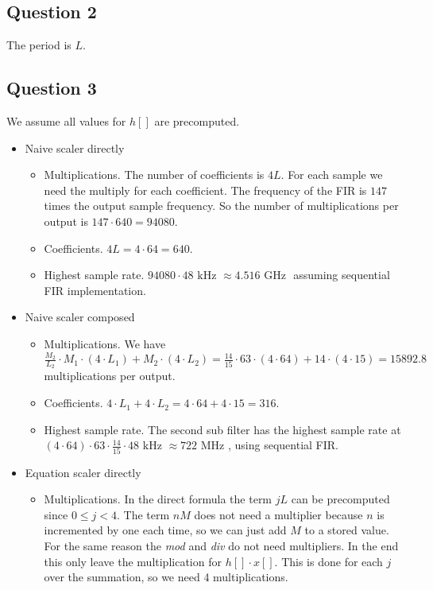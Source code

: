 \subsection{Question 2}
The period is $L$.

\subsection{Question 3} \label{sec:Q3}
We assume all values for $h[]$ are precomputed.
\begin{itemize}
\item Naive scaler directly
\begin{itemize}
\item Multiplications. The number of coefficients is $4L$. For each sample we need the multiply for each coefficient. The frequency of the FIR is $147$ times the output sample frequency. So the number of multiplications per output is $147 \cdot 640 = 94080$.
\item Coefficients. $4L = 4 \cdot 64 = 640$.
\item Highest sample rate. $94080 \cdot 48 \text{ kHz } \approx 4.516  \text{ GHz }$ assuming sequential FIR implementation.
\end{itemize}
\item Naive scaler composed
\begin{itemize}
\item Multiplications. We have $\frac{M_2}{L_2} \cdot M_1 \cdot (4 \cdot L_1) + M_2 \cdot (4 \cdot L_2) = \frac{14}{15} \cdot 63 \cdot (4 \cdot 64) + 14 \cdot (4 \cdot 15) = 15892.8$ multiplications per output. 
\item Coefficients. $4 \cdot L_1 + 4 \cdot L_2 = 4 \cdot 64 + 4\cdot 15 = 316$.
\item Highest sample rate. The second sub filter has the highest sample rate at $(4 \cdot 64) \cdot 63 \cdot \frac{14}{15} \cdot 48 \text{ kHz } \approx 722\text{ MHz }$, using sequential FIR.
\end{itemize}
\item Equation scaler directly
\begin{itemize}
\item Multiplications. In the direct formula the term $jL$ can be precomputed since $0\leq j<4$. The term $nM$ does not need a multiplier because $n$ is incremented by one each time, so we can just add $M$ to a stored value. For the same reason the \emph{mod} and \emph{div} do not need multipliers. In the end this only leave the multiplication for $h[]\cdot x[]$. This is done for each $j$ over the summation, so we need 4 multiplications. 

\end{itemize}
\end{itemize}
